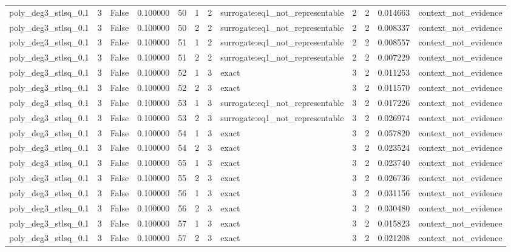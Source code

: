 \begin{tabular}{lrrrrrrlrrrl}
poly\_deg3\_stlsq\_0.1 & 3 & False & 0.100000 & 50 & 1 & 2 & surrogate:eq1\_not\_representable & 2 & 2 & 0.014663 & context\_not\_evidence \\
poly\_deg3\_stlsq\_0.1 & 3 & False & 0.100000 & 50 & 2 & 2 & surrogate:eq1\_not\_representable & 2 & 2 & 0.008337 & context\_not\_evidence \\
poly\_deg3\_stlsq\_0.1 & 3 & False & 0.100000 & 51 & 1 & 2 & surrogate:eq1\_not\_representable & 2 & 2 & 0.008557 & context\_not\_evidence \\
poly\_deg3\_stlsq\_0.1 & 3 & False & 0.100000 & 51 & 2 & 2 & surrogate:eq1\_not\_representable & 2 & 2 & 0.007229 & context\_not\_evidence \\
poly\_deg3\_stlsq\_0.1 & 3 & False & 0.100000 & 52 & 1 & 3 & exact & 3 & 2 & 0.011253 & context\_not\_evidence \\
poly\_deg3\_stlsq\_0.1 & 3 & False & 0.100000 & 52 & 2 & 3 & exact & 3 & 2 & 0.011570 & context\_not\_evidence \\
poly\_deg3\_stlsq\_0.1 & 3 & False & 0.100000 & 53 & 1 & 3 & surrogate:eq1\_not\_representable & 3 & 2 & 0.017226 & context\_not\_evidence \\
poly\_deg3\_stlsq\_0.1 & 3 & False & 0.100000 & 53 & 2 & 3 & surrogate:eq1\_not\_representable & 3 & 2 & 0.026974 & context\_not\_evidence \\
poly\_deg3\_stlsq\_0.1 & 3 & False & 0.100000 & 54 & 1 & 3 & exact & 3 & 2 & 0.057820 & context\_not\_evidence \\
poly\_deg3\_stlsq\_0.1 & 3 & False & 0.100000 & 54 & 2 & 3 & exact & 3 & 2 & 0.023524 & context\_not\_evidence \\
poly\_deg3\_stlsq\_0.1 & 3 & False & 0.100000 & 55 & 1 & 3 & exact & 3 & 2 & 0.023740 & context\_not\_evidence \\
poly\_deg3\_stlsq\_0.1 & 3 & False & 0.100000 & 55 & 2 & 3 & exact & 3 & 2 & 0.026736 & context\_not\_evidence \\
poly\_deg3\_stlsq\_0.1 & 3 & False & 0.100000 & 56 & 1 & 3 & exact & 3 & 2 & 0.031156 & context\_not\_evidence \\
poly\_deg3\_stlsq\_0.1 & 3 & False & 0.100000 & 56 & 2 & 3 & exact & 3 & 2 & 0.030480 & context\_not\_evidence \\
poly\_deg3\_stlsq\_0.1 & 3 & False & 0.100000 & 57 & 1 & 3 & exact & 3 & 2 & 0.015823 & context\_not\_evidence \\
poly\_deg3\_stlsq\_0.1 & 3 & False & 0.100000 & 57 & 2 & 3 & exact & 3 & 2 & 0.021208 & context\_not\_evidence \\

\end{tabular}
